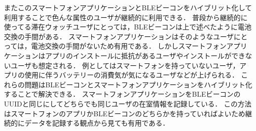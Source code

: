 またこのスマートフォンアプリケーションとBLEビーコンをハイブリット化して利用することで色んな属性のユーザが継続的に利用できる．
普段から継続的に使ってる滞在ウォッチユーザにとっては，BLEビーコンは上で述べたように電池交換の手間がある．
スマートフォンアプリケーションはそのようなユーザにとっては，電池交換の手間がないため有用である．
しかしスマートフォンアプリケーションはアプリのインストールに抵抗があるユーザやインストールができないユーザも想定される．
例としてはスマートフォンを持っていないユーザ，アプリの使用に伴うバッテリーの消費気が気になるユーザなどが上げられる．
これらの問題はBLEビーコンとスマートフォンアプリケーションをハイブリット化することで解決できる．
スマートフォンアプリケーションをBLEビーコンのUUIDと同じにしてどちらでも同じユーザの在室情報を記録している．
この方法はスマートフォンのアプリかBLEビーコンのどちらかを持っていればよいため継続的にデータを記録する観点から見ても有用である．














